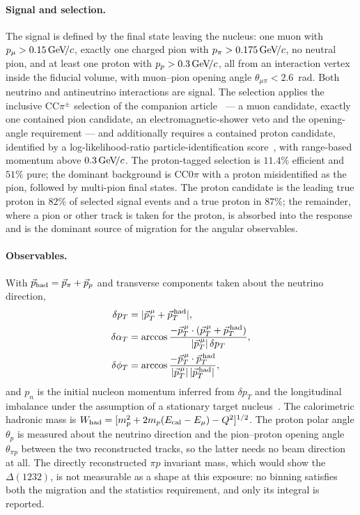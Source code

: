 \documentclass[aps,prl,twocolumn,superscriptaddress,nofootinbib,floatfix]{revtex4-2}
\begin{document}
\paragraph*{Signal and selection.}
The signal is defined by the final state leaving the nucleus: one muon with $p_\mu>0.15\,\text{GeV}\!/c$,
exactly one charged pion with $p_\pi>0.175\,\text{GeV}\!/c$, no neutral pion, and at least one proton with
$p_p>0.3\,\text{GeV}\!/c$, all from an interaction vertex inside the fiducial volume, with muon--pion opening
angle $\theta_{\mu\pi}<2.6$~rad. Both neutrino and antineutrino interactions are signal. The
selection applies the inclusive CC$\pi^\pm$ selection of the companion article~\cite{companion_prd}
--- a muon candidate, exactly one contained pion candidate, an electromagnetic-shower veto and
the opening-angle requirement --- and additionally requires a contained proton candidate,
identified by a log-likelihood-ratio particle-identification score~\cite{uboone_llr}, with
range-based momentum above $0.3\,\text{GeV}\!/c$. The proton-tagged selection is $11.4\%$ efficient and
$51\%$ pure; the dominant background is CC$0\pi$ with a proton misidentified as the pion,
followed by multi-pion final states. The proton candidate is the leading true proton in $82\%$ of
selected signal events and a true proton in $87\%$; the remainder, where a pion or other track is
taken for the proton, is absorbed into the response and is the dominant source of migration for
the angular observables.

\paragraph*{Observables.}
With $\vec p_{\rm had}=\vec p_\pi+\vec p_p$ and transverse components taken about the neutrino
direction,
\begin{align}
  \delta p_T &= |\vec p_T^{\,\mu}+\vec p_T^{\,\rm had}|, \\
  \delta\alpha_T &= \arccos\frac{-\vec p_T^{\,\mu}\cdot(\vec p_T^{\,\mu}+\vec p_T^{\,\rm had})}
                              {|\vec p_T^{\,\mu}|\,\delta p_T}, \\
  \delta\phi_T &= \arccos\frac{-\vec p_T^{\,\mu}\cdot\vec p_T^{\,\rm had}}
                            {|\vec p_T^{\,\mu}|\,|\vec p_T^{\,\rm had}|},
\end{align}
and $p_n$ is the initial nucleon momentum inferred from $\delta p_T$ and the longitudinal
imbalance under the assumption of a stationary target nucleus~\cite{furmanski_pn}. The
calorimetric hadronic mass is $W_{\rm had}=[m_p^2+2m_p(E_{\rm cal}-E_\mu)-Q^2]^{1/2}$. The proton
polar angle $\theta_p$ is measured about the neutrino direction and the pion--proton opening angle
$\theta_{\pi p}$ between the two reconstructed tracks, so the latter needs no beam direction at
all. The directly reconstructed $\pi p$ invariant mass, which would show the $\Delta(1232)$, is not
measurable as a shape at this exposure: no binning satisfies both the migration and the statistics
requirement, and only its integral is reported.
\end{document}
